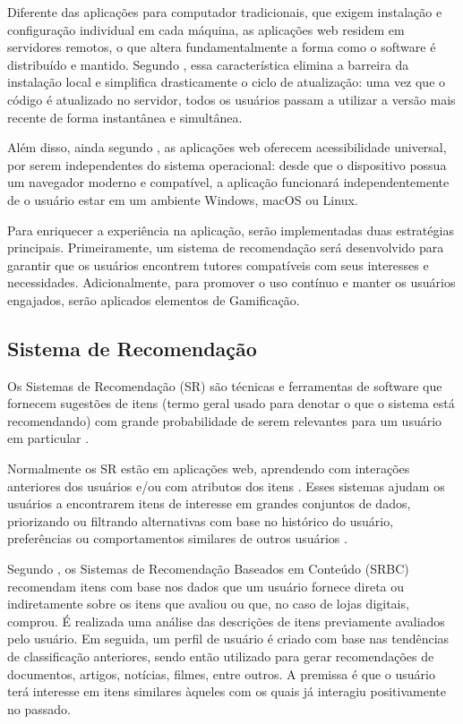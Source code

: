 Diferente das aplicações para computador tradicionais, que exigem instalação e configuração individual em cada máquina, as aplicações web residem em servidores remotos, o que altera fundamentalmente a forma como o software é distribuído e mantido. Segundo , essa característica elimina a barreira da instalação local e simplifica drasticamente o ciclo de atualização: uma vez que o código é atualizado no servidor, todos os usuários passam a utilizar a versão mais recente de forma instantânea e simultânea. 

Além disso, ainda segundo , as aplicações web oferecem acessibilidade universal, por serem independentes do sistema operacional: desde que o dispositivo possua um navegador moderno e compatível, a aplicação funcionará independentemente de o usuário estar em um ambiente Windows, macOS ou Linux.

Para enriquecer a experiência na aplicação, serão implementadas duas estratégias principais. Primeiramente, um sistema de recomendação será desenvolvido para garantir que os usuários encontrem tutores compatíveis com seus interesses e necessidades. Adicionalmente, para promover o uso contínuo e manter os usuários engajados, serão aplicados elementos de Gamificação.

\subsection[Sistema de Recomendação]{Sistema de Recomendação}
\label{sec:recomendação}

Os Sistemas de Recomendação (SR) são técnicas e ferramentas de software que fornecem sugestões de itens (termo geral usado para denotar o que o sistema está recomendando) com grande probabilidade de serem relevantes para um usuário em particular \cite{springerSR2022}.

Normalmente os SR estão em aplicações web, aprendendo com interações anteriores dos usuários e/ou com atributos dos itens \cite{Aggarwal2016}. Esses sistemas ajudam os usuários a encontrarem itens de interesse em grandes conjuntos de dados, priorizando ou filtrando alternativas com base no histórico do usuário, preferências ou comportamentos similares de outros usuários \cite{springerSR2022}.

Segundo , os Sistemas de Recomendação Baseados em Conteúdo (SRBC) recomendam itens com base nos dados que um usuário fornece direta ou indiretamente sobre os itens que avaliou ou que, no caso de lojas digitais, comprou. É realizada uma análise das descrições de itens previamente avaliados pelo usuário. Em seguida, um perfil de usuário é criado com base nas tendências de classificação anteriores, sendo então utilizado para gerar recomendações de documentos, artigos, notícias, filmes, entre outros. A premissa é que o usuário terá interesse em itens similares àqueles com os quais já interagiu positivamente no passado.

